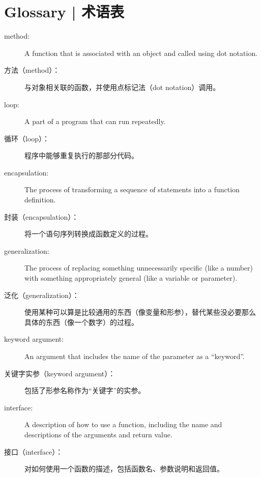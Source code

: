 \section{Glossary  |  术语表}

\begin{description}

\item[method:] A function that is associated with an object and called
using dot notation.

\item[方法（method）：]
    与对象相关联的函数，并使用点标记法（dot notation）调用。

\item[loop:] A part of a program that can run repeatedly.

\item[循环（loop）：]
    程序中能够重复执行的那部分代码。

\item[encapsulation:] The process of transforming a sequence of
statements into a function definition.

\item[封装（encapsulation）：]
    将一个语句序列转换成函数定义的过程。

\item[generalization:] The process of replacing something
unnecessarily specific (like a number) with something appropriately
general (like a variable or parameter).

\item[泛化（generalization）：]
    使用某种可以算是比较通用的东西（像变量和形参），替代某些没必要那么具体的东西（像一个数字）的过程。

\item[keyword argument:] An argument that includes the name of
the parameter as a ``keyword''.

\item[关键字实参（keyword argument）：]
    包括了形参名称作为“关键字”的实参。

\item[interface:] A description of how to use a function, including
the name and descriptions of the arguments and return value.

\item[接口（interface）：]
    对如何使用一个函数的描述，包括函数名、参数说明和返回值。



\end{description}
